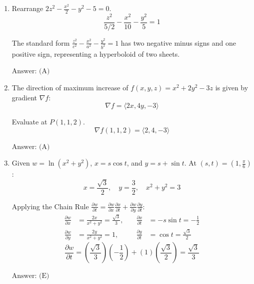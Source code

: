 \documentclass[a4paper, 12pt]{article}
\begin{document}
\begin{enumerate}[leftmargin=*,label=\textbf{\arabic*.}]
Calculate area.
\begin{align*}
    A &= \frac{1}{2} \int_{-\pi/3}^{\pi/3} \left( r_1^2 - r_2^2 \right) d\theta = \int_{0}^{\pi/3} \left( 8\cos^2\theta - 2\cos\theta - 1 \right) d\theta \\
      &= \int_{0}^{\pi/3} \left( 3 + 4\cos 2\theta - 2\cos\theta \right) d\theta \\
      &= \left[ 3\theta + 2\sin 2\theta - 2\sin\theta \right]_0^{\pi/3} = \pi
\end{align*}

$\boxed{\text{Answer: (A)}}$

\item Rearrange $2z^2 - \frac{x^2}{2} - y^2 - 5 = 0$.
\[\frac{z^2}{5/2} - \frac{x^2}{10} - \frac{y^2}{5} = 1\]

The standard form $\frac{z^2}{c^2} - \frac{x^2}{a^2} - \frac{y^2}{b^2} = 1$ has two negative minus signs and one positive sign, representing a hyperboloid of two sheets.

$\boxed{\text{Answer: (A)}}$

\item The direction of maximum increase of $f(x,y,z) = x^2 + 2y^2 - 3z$ is given by gradient $\nabla f$:
\[\nabla f = \langle 2x, 4y, -3 \rangle\]

Evaluate at $P(1,1,2)$.
\[\nabla f(1,1,2) = \langle 2, 4, -3 \rangle\]

$\boxed{\text{Answer: (A)}}$

\item Given $w = \ln(x^2 + y^2)$, $x = s\cos t$, and $y = s + \sin t$. At $(s,t) = \left(1, \frac{\pi}{6}\right)$:
\[x = \frac{\sqrt{3}}{2}, \quad y = \frac{3}{2}, \quad x^2 + y^2 = 3\]

Applying the Chain Rule $\frac{\partial w}{\partial t} = \frac{\partial w}{\partial x}\frac{\partial x}{\partial t} + \frac{\partial w}{\partial y}\frac{\partial y}{\partial t}$:
\begin{align*}
    \frac{\partial w}{\partial x} &= \frac{2x}{x^2+y^2} = \frac{\sqrt{3}}{3}, \quad &\frac{\partial x}{\partial t} &= -s\sin t = -\frac{1}{2} \\
    \frac{\partial w}{\partial y} &= \frac{2y}{x^2+y^2} = 1, \quad &\frac{\partial y}{\partial t} &= \cos t = \frac{\sqrt{3}}{2}
\end{align*}
\[\frac{\partial w}{\partial t} = \left(\frac{\sqrt{3}}{3}\right)\left(-\frac{1}{2}\right) + (1)\left(\frac{\sqrt{3}}{2}\right) = \frac{\sqrt{3}}{3}\]

$\boxed{\text{Answer: (E)}}$


\end{enumerate}
\end{document}
